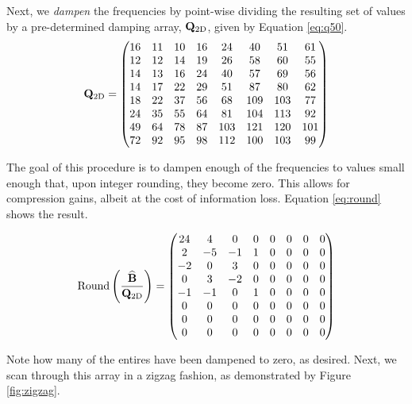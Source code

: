 Next, we {\em dampen} the frequencies by point-wise dividing the resulting set of values by a pre-determined damping array, $\mathbf{Q}_{\textrm{2D}}$, given by Equation \ref{eq:q50}. 
\begin{equation}
	\mathbf{Q}_{\textrm{2D}} = \begin{pmatrix}
	16 & 11 & 10 & 16 & 24 & 40 & 51 & 61\\
	12 & 12 & 14 & 19 & 26 & 58 & 60 & 55\\
	14 & 13 & 16 & 24 & 40 & 57 & 69 & 56\\
	14 & 17 & 22 & 29 & 51 & 87 & 80 & 62\\
	18 & 22 & 37 & 56 & 68 & 109 & 103 & 77\\
	24 & 35 & 55 & 64 & 81 & 104 & 113 & 92\\
	49 & 64 & 78 & 87 & 103 & 121 & 120 & 101\\
	72 & 92 & 95 & 98 & 112 & 100 & 103 & 99	
	\end{pmatrix}
\label{eq:q50}	
\end{equation}

The goal of this procedure is to dampen enough of the frequencies to values small enough that, upon integer rounding, they become zero. This allows for compression gains, albeit at the cost of information loss. Equation \ref{eq:round} shows the result.

\begin{equation}
	\textnormal{Round}\left(\frac{\widehat{\mathbf{B}}}{\mathbf{Q}_{\textrm{2D}}}\right) = \begin{pmatrix}
	24 &	4 &	0 &	0 &	0 &	0 &	0 &	0\\
	2 &	-5 &	-1 &	1 &	0 &	0 &	0 &	0\\
	-2 &	0 &	3 &	0 &	0 &	0 &	0 &	0\\
	0 &	3 &	-2 &	0 &	0 &	0 &	0 &	0\\
	-1 &	-1 &	0 &	1 &	0 &	0 &	0 &	0\\
	0 &	0 &	0 &	0 &	0 &	0 &	0 &	0\\
	0 &	0 &	0 &	0 &	0 &	0 &	0 &	0\\
	0 &	0 &	0 &	0 &	0 &	0 &	0 &	0
	\end{pmatrix}
\label{eq:round}
\end{equation}

Note how many of the entires have been dampened to zero, as desired. Next, we scan through this array in a zigzag fashion, as demonstrated by Figure \ref{fig:zigzag}.

